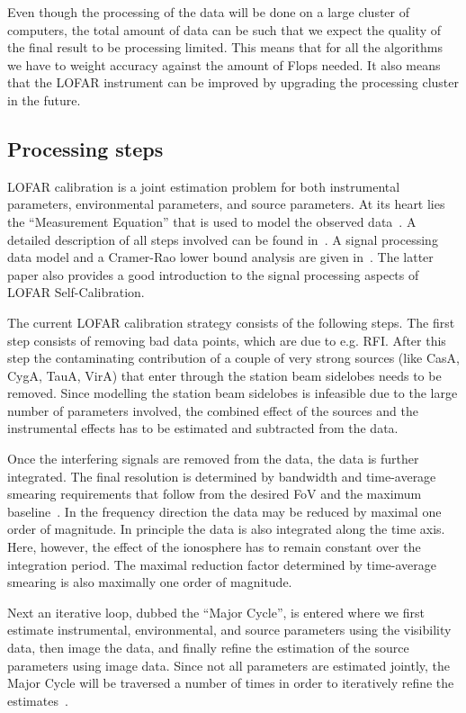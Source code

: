 \documentclass[journal]{IEEEtran}
\begin{document}
Even though the processing of the data will be done on a large cluster of computers, the total amount of data can be such that we expect the quality of the final result to be processing limited. This means that for all the algorithms we have to weight accuracy against the amount of Flops needed. It also means that the LOFAR instrument can be improved by upgrading the processing cluster in the future. 

\subsection{Processing steps}

LOFAR calibration is a joint estimation problem for both instrumental parameters, environmental parameters, and source parameters. At its heart lies the ``Measurement Equation'' that is used to model the observed data~\cite{Hamaker:96}. A detailed description of all steps involved can be found in~\cite{Noordam:05}. A signal processing data model and a Cramer-Rao lower bound analysis are given in~\cite{Tol:07}. The latter paper also provides a good introduction to the signal processing aspects of LOFAR Self-Calibration.   

\label{sec:RFI}
The current LOFAR calibration strategy consists of the following steps. The first step consists of removing bad data points, which are due to e.g. RFI. After this step the contaminating contribution of a couple of very strong sources (like CasA, CygA, TauA, VirA) that enter through the station beam sidelobes needs to be removed. Since modelling the station beam sidelobes is infeasible due to the large number of parameters involved, the combined effect of the sources and the instrumental effects has to be estimated and subtracted from the data. 

Once the interfering signals are removed from the data, the data is further integrated. The final resolution is determined by bandwidth and time-average smearing requirements that follow from the desired FoV and the maximum baseline~\cite{SIRAII:99}. In the frequency direction the data may be reduced by maximal one order of magnitude. In principle the data is also integrated along the time axis. Here, however, the effect of the ionosphere has to remain constant over the integration period. The maximal reduction factor determined by time-average smearing is also maximally one order of magnitude.

Next an iterative loop, dubbed the ``Major Cycle'', is entered where we first estimate instrumental, environmental, and source parameters using the visibility data, then image the data, and finally refine the estimation  of the source parameters using image data. Since not all parameters are estimated jointly, the Major Cycle will be traversed a number of times in order to iteratively refine the estimates~\cite{Nijboer:07}. 
\end{document}
